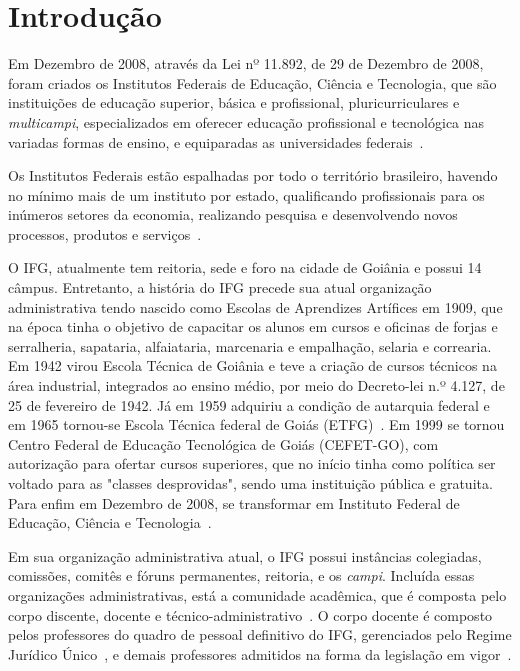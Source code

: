 \chapter{Introdução}
\label{chp:introducao}

Em Dezembro de 2008, através da Lei nº 11.892, de 29 de Dezembro de 2008, foram criados os  Institutos Federais de Educação, Ciência e Tecnologia, que são instituições de educação superior, básica e profissional, pluricurriculares e \textit{multicampi}, especializados em oferecer educação profissional e tecnológica nas variadas formas de ensino, e equiparadas as universidades federais~\citep{lei11892}.

Os Institutos Federais estão espalhadas por todo o território brasileiro, havendo no mínimo mais de um instituto por estado, qualificando profissionais para os inúmeros setores da economia, realizando pesquisa e desenvolvendo novos processos, produtos e serviços~\citep{historiaif}. 

O \acf{IFG}, atualmente tem reitoria, sede e foro na cidade de Goiânia e possui 14 câmpus.
Entretanto, a história do IFG precede sua atual organização administrativa tendo nascido como Escolas de Aprendizes Artífices em 1909, que na época tinha o objetivo de capacitar os alunos em cursos e oficinas de forjas e serralheria, sapataria, alfaiataria, marcenaria e empalhação, selaria e correaria. 
Em 1942 virou Escola Técnica de Goiânia e teve a criação de cursos técnicos na área industrial, integrados ao ensino médio, por meio do Decreto-lei n.º 4.127, de 25 de fevereiro de 1942. 
Já em 1959 adquiriu a condição de autarquia federal e em 1965 tornou-se Escola Técnica federal de Goiás (ETFG)~\citep{historiaifg}. 
Em 1999 se tornou Centro Federal de Educação Tecnológica de Goiás (CEFET-GO), com autorização para ofertar cursos superiores, que no início tinha como política ser voltado para as "classes desprovidas", sendo uma instituição pública e gratuita. Para enfim em Dezembro de 2008, se transformar em Instituto Federal de Educação, Ciência e Tecnologia~\citep{historiaif}. 

Em sua organização administrativa atual, o IFG possui instâncias colegiadas, comissões, comitês e fóruns permanentes, reitoria, e os \textit{campi}. 
Incluída essas organizações administrativas, está a comunidade acadêmica, que é composta pelo corpo discente, docente e técnico-administrativo~\citep{regimentoifg}.
O corpo docente é composto pelos professores do quadro de pessoal definitivo do IFG, gerenciados pelo Regime Jurídico Único~\citep{brasil1990lei}, e demais professores admitidos na forma da legislação em vigor~\citep{regimentoifg}.

